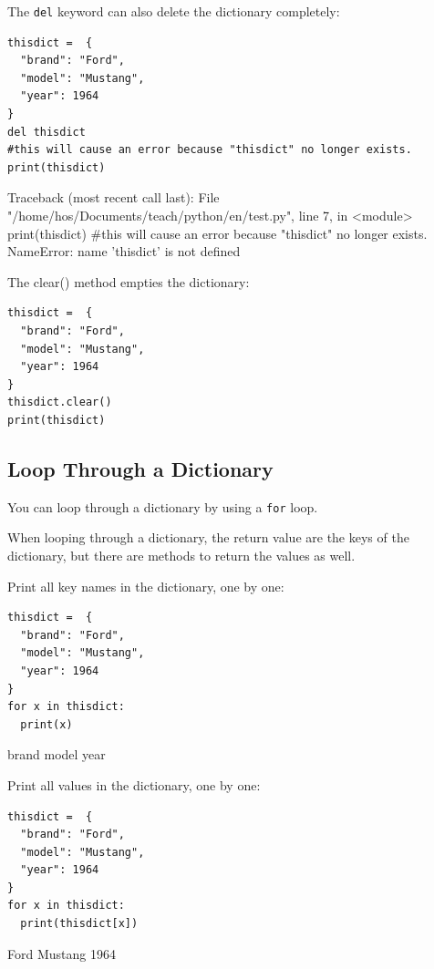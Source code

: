 \documentclass[12pt,a4paper]{article}
\newcommand{\code}[1]{%
	\colorbox{backcolour}{\lstinline{#1}}%
}
\newcommand{\lcode}[1]{%
	\lstinline{#1}%
}
\begin{document}
\begin{abox}
The \lcode{del} keyword can also delete the dictionary completely:
	\begin{lstlisting}
thisdict =	{
  "brand": "Ford",
  "model": "Mustang",
  "year": 1964
}
del thisdict
#this will cause an error because "thisdict" no longer exists. 
print(thisdict)
	\end{lstlisting}
\tcblower
	\begin{vercode}
Traceback (most recent call last):
  File "/home/hos/Documents/teach/python/en/test.py", line 7,
  in <module>
    print(thisdict) #this will cause an error because "thisdict"
    no longer exists.
NameError: name 'thisdict' is not defined
	\end{vercode}
\end{abox}

\begin{ebox}
The clear() method empties the dictionary:
	\begin{lstlisting}
thisdict =	{
  "brand": "Ford",
  "model": "Mustang",
  "year": 1964
}
thisdict.clear()
print(thisdict)
	\end{lstlisting}
\tcblower
	\begin{vercode}
{}
	\end{vercode}
\end{ebox}
\subsection{Loop Through a Dictionary}

You can loop through a dictionary by using a \code{for} loop.

When looping through a dictionary, the return value are the keys of the
dictionary, but there are methods to return the values as well.

\begin{ebox}
Print all key names in the dictionary, one by one:
	\begin{lstlisting}
thisdict =	{
  "brand": "Ford",
  "model": "Mustang",
  "year": 1964
}
for x in thisdict:
  print(x)
	\end{lstlisting}
\tcblower
	\begin{vercode}
brand
model
year
	\end{vercode}
\end{ebox}

\begin{ebox}
Print all values in the dictionary, one by one:
	\begin{lstlisting}
thisdict =	{
  "brand": "Ford",
  "model": "Mustang",
  "year": 1964
}
for x in thisdict:
  print(thisdict[x])
	\end{lstlisting}
\tcblower
	\begin{vercode}
Ford
Mustang
1964
	\end{vercode}
\end{ebox}
\end{document}
